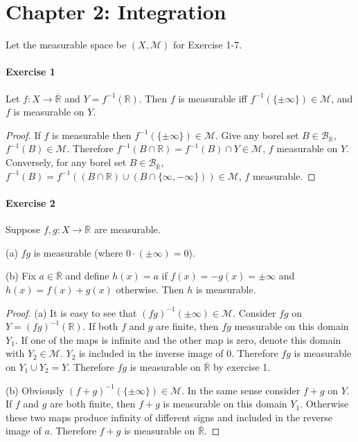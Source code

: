 \section{Chapter 2: Integration}
Let the measurable space be $(X,\mathcal{M})$ for Exercise 1-7.
\paragraph{Exercise 1}
Let $f:X\to\overline{\mathbb{R}}$ and $Y=f^{-1}(\mathbb{R})$. Then $f$ is measurable iff $f^{-1}(\{\pm\infty\})\in\mathcal{M}$, and $f$ is measurable on $Y$.
\begin{proof}
    If $f$ is measurable then $f^{-1}(\{\pm\infty\})\in\mathcal{M}$. Give any borel set $B\in\mathcal{B}_{\overline{\mathbb{R}}}$, $f^{-1}(B)\in\mathcal{M}$. Therefore $f^{-1}(B\cap\mathbb{R})=f^{-1}(B)\cap Y\in\mathcal{M}$, $f$ measurable on $Y$. Conversely, for any borel set $B\in\mathcal{B}_{\overline{\mathbb{R}}}$, $f^{-1}(B)=f^{-1}((B\cap\mathbb{R})\cup(B\cap\{\infty,-\infty\}))\in\mathcal{M}$, $f$ measurable.
\end{proof}
\paragraph{Exercise 2}
Suppose $f,g:X\to\overline{\mathbb{R}}$ are measurable.
\par (a) $fg$ is measurable (where $0\cdot(\pm\infty)=0$).
\par (b) Fix $a\in\overline{\mathbb{R}}$ and define $h(x)=a$ if $f(x)=-g(x)=\pm\infty$ and $h(x)=f(x)+g(x)$ otherwise. Then $h$ is measurable.
\begin{proof}
    (a) It is easy to see that $(fg)^{-1}(\pm\infty)\in\mathcal{M}$. Consider $fg$ on $Y=(fg)^{-1}(\mathbb{R})$. If both $f$ and $g$ are finite, then $fg$ measurable on this domain $Y_1$. If one of the maps is infinite and the other map is zero, denote this domain with $Y_2\in\mathcal{M}$. $Y_2$ is included in the inverse image  of $0$. Therefore $fg$ is measurable on $Y_1\cup Y_2=Y$. Therefore $fg$ is measurable on $\overline{\mathbb{R}}$ by exercise 1.
    \par (b) Obviously $(f+g)^{-1}(\{\pm\infty\})\in\mathcal{M}$. In the same sense consider $f+g$ on $Y$. If $f$ and $g$ are both finite, then $f+g$ is measurable on this domain $Y_1$. Otherwise these two maps produce infinity of different signs and included in the reverse image of $a$. Therefore $f+g$ is measurable on $\overline{\mathbb{R}}$. 
\end{proof}
